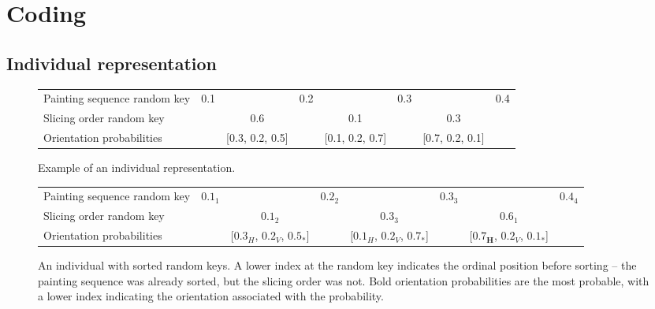 \section{Coding}\label{sec:coding}

\subsection{Individual representation}\label{subsec:individual-representation}

\begin{figure}[htp]

    \begin{tabular}{lccccccc}
        Painting sequence random key & 0.1 &                     & 0.2 &                     & 0.3 &                     & 0.4 \\
        Slicing order random key     &     & 0.6                 &     & 0.1                 &     & 0.3                 &     \\
        Orientation probabilities    &     & {[}0.3, 0.2, 0.5{]} &     & {[}0.1, 0.2, 0.7{]} &     & {[}0.7, 0.2, 0.1{]} &
    \end{tabular}
    \caption{Example of an individual representation.}
    \label{tab:ind-rep-example}

    \bigskip

    \begin{tabular}{lccccccc}
        Painting sequence random key & $0.1_1$ &                                      & $0.2_2$ &                                      & $0.3_3$ &                                      & $0.4_4$ \\
        Slicing order random key     &         & $0.1_2$                              &         & $0.3_3$                              &         & $0.6_1$                              &         \\
        Orientation probabilities    &         & [$0.3_H$, $0.2_V$, $\mathbf{0.5_*]}$ &         & [$0.1_H$, $0.2_V$, $\mathbf{0.7_*}$] &         & [$\mathbf{0.7_H}$, $0.2_V$, $0.1_*$] &
    \end{tabular}
    \caption{An individual with sorted random keys. A lower index at the random key indicates the ordinal position before sorting – the painting sequence was already sorted, but the slicing order was not. Bold orientation probabilities are the most probable, with a lower index indicating the orientation associated with the probability.}
    \label{tab:ind-rep-sorted}

    \bigskip


\end{figure}
